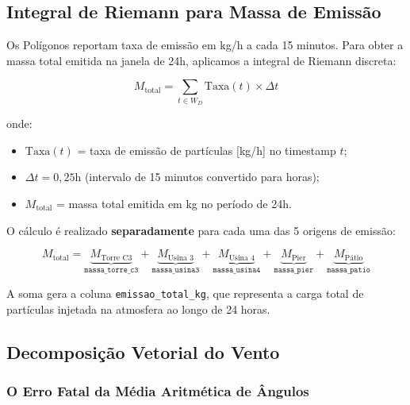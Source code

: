 \documentclass[12pt, a4paper]{article}
\newcommand{\feature}[1]{\texttt{#1}}
\begin{document}
\subsection{Integral de Riemann para Massa de Emissão}
\label{subsec:riemann}

Os Polígonos reportam taxa de emissão em \si{kg/h} a cada 15 minutos.
Para obter a massa total emitida na janela de 24h, aplicamos a integral
de Riemann discreta:

\begin{equation}
    M_{\text{total}} = \sum_{t \in W_D} \text{Taxa}(t) \times \Delta t
    \label{eq:riemann}
\end{equation}

onde:
\begin{itemize}[noitemsep]
    \item $\text{Taxa}(t)$ = taxa de emissão de partículas [\si{kg/h}] no
          timestamp $t$;
    \item $\Delta t = 0{,}25\text{h}$ (intervalo de 15 minutos convertido
          para horas);
    \item $M_{\text{total}}$ = massa total emitida em \si{kg} no período de
          24h.
\end{itemize}

O cálculo é realizado \textbf{separadamente} para cada uma das 5 origens
de emissão:

\begin{equation}
    M_{\text{total}} = \underbrace{M_{\text{Torre C3}}}_{
        \feature{massa\_torre\_c3}} +
    \underbrace{M_{\text{Usina 3}}}_{
        \feature{massa\_usina3}} +
    \underbrace{M_{\text{Usina 4}}}_{
        \feature{massa\_usina4}} +
    \underbrace{M_{\text{Pier}}}_{
        \feature{massa\_pier}} +
    \underbrace{M_{\text{Pátio}}}_{
        \feature{massa\_patio}}
    \label{eq:massa_fontes}
\end{equation}

A soma gera a coluna \feature{emissao\_total\_kg}, que representa a
carga total de partículas injetada na atmosfera ao longo de 24 horas.

\subsection{Decomposição Vetorial do Vento}
\label{subsec:vetorial}

\subsubsection{O Erro Fatal da Média Aritmética de Ângulos}
\end{document}
